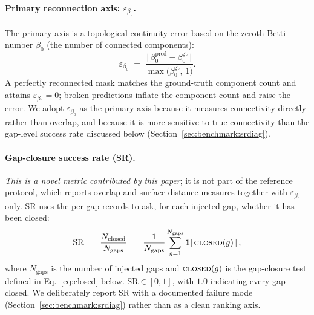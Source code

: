 \paragraph{Primary reconnection axis: $\varepsilon_{\beta_0}$.} The primary
axis is a topological continuity error based on the zeroth Betti number
$\beta_0$ (the number of connected components):
\begin{equation}
  \varepsilon_{\beta_0}
  \;=\;
  \frac{\bigl|\,\beta_0^{\text{pred}} - \beta_0^{\text{gt}}\,\bigr|}
       {\max\!\bigl(\beta_0^{\text{gt}},\, 1\bigr)} .
  \label{eq:epsbeta0}
\end{equation}
A perfectly reconnected mask matches the ground-truth component count and
attains $\varepsilon_{\beta_0} = 0$; broken predictions inflate the component
count and raise the error. We adopt $\varepsilon_{\beta_0}$ as the primary
axis because it measures connectivity directly rather than overlap, and
because it is more sensitive to true connectivity than the gap-level success
rate discussed below (Section~\ref{sec:benchmark:srdiag}).

\paragraph{Gap-closure success rate (SR).} \emph{This is a novel metric
contributed by this paper}; it is not part of the reference protocol, which
reports overlap and surface-distance measures together with
$\varepsilon_{\beta_0}$ only. SR uses the per-gap records to ask, for each
injected gap, whether it has been closed:
\begin{equation}
  \mathrm{SR}
  \;=\;
  \frac{N_{\text{closed}}}{N_{\text{gaps}}}
  \;=\;
  \frac{1}{N_{\text{gaps}}}
  \sum_{g=1}^{N_{\text{gaps}}}
  \mathbf{1}\!\left[\,\textsc{closed}(g)\,\right],
  \label{eq:sr}
\end{equation}
where $N_{\text{gaps}}$ is the number of injected gaps and
$\textsc{closed}(g)$ is the gap-closure test defined in
Eq.~\eqref{eq:closed} below. $\mathrm{SR} \in [0,1]$, with $1.0$ indicating
every gap closed. We deliberately report SR with a documented failure mode
(Section~\ref{sec:benchmark:srdiag}) rather than as a clean ranking axis.

